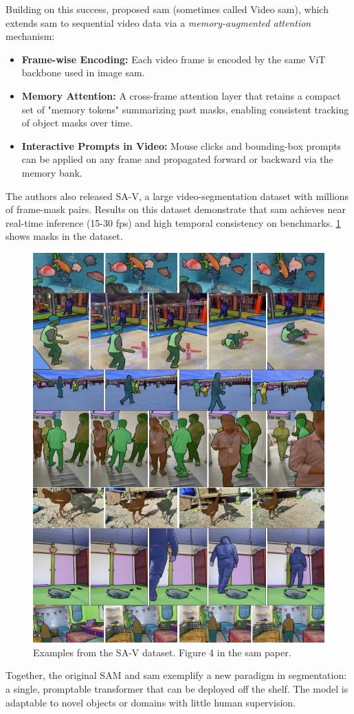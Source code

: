 Building on this success, \textcite{ravi_sam_nodate} proposed \acrfull{sam} (sometimes called Video \acrshort{sam}), which extends \acrshort{sam} to sequential video data via a \emph{memory-augmented attention} mechanism:
\begin{itemize}
    \item \textbf{Frame-wise Encoding:} Each video frame is encoded by the same ViT backbone used in image \acrshort{sam}.
    \item \textbf{Memory Attention:} A cross-frame attention layer that retains a compact set of "memory tokens" summarizing past masks, enabling consistent tracking of object masks over time.
    \item \textbf{Interactive Prompts in Video:} Mouse clicks and bounding-box prompts can be applied on any frame and propagated forward or backward via the memory bank.
\end{itemize}

The authors also released SA-V, a large video-segmentation dataset with millions of frame-mask pairs. Results on this dataset demonstrate that \acrshort{sam} achieves near real-time inference (15-30 fps) and high temporal consistency on benchmarks. \cref{fig:sa-v} shows masks in the dataset. 

\begin{figure}
    \centering
    \includegraphics[width=0.5\linewidth]{figures/sam_2.png}
    \caption{Examples from the SA-V dataset. Figure 4 in the \acrshort{sam} paper\cite{ravi_sam_nodate}.}
    \label{fig:sa-v}
\end{figure}

Together, the original SAM and \acrshort{sam} exemplify a new paradigm in segmentation: a single, promptable transformer that can be deployed off the shelf. The model is adaptable to novel objects or domains with little human supervision. 

